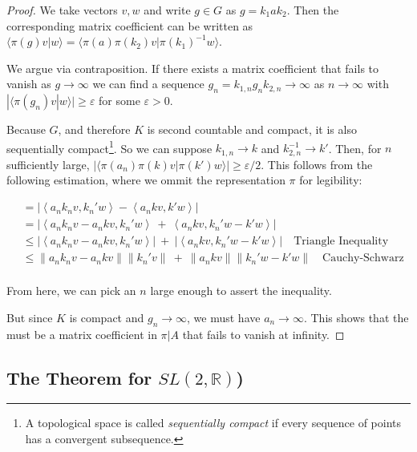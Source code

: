 \documentclass[
  12pt
]{article}
\theoremstyle{plain}
\newtheorem*{proof}{Proof}
\newcommand{\abs}[1]{| #1 |}
\newcommand{\inn}[1]{\left\langle #1 \right\rangle}
\newcommand{\norm}[1]{\lVert #1 \rVert}
\begin{document}
  \begin{proof}
    \label{pf:lemma}
    We take vectors $v, w$ and write $g \in G$ as $g = k_1 a k_2$.
    Then the corresponding matrix
    coefficient can be written as $\langle \pi(g)v|w \rangle = \langle \pi(a) \pi(k_2) v | \pi(k_1)^{-1} w \rangle$.

    We argue via contraposition.
    If there exists a matrix coefficient that fails to vanish as $g \rightarrow \infty$
    we can find a sequence $g_n = k_{1,n} g_{n} k_{2,n} \rightarrow \infty$ as
    $n \rightarrow \infty$ with
    $|\langle \pi(g_n) v | w \rangle | \geq \varepsilon$ for some $\varepsilon > 0$.

    Because $G$, and therefore $K$ is second countable and compact, it is also sequentially compact\footnote{A topological space is called \emph{sequentially compact} if every sequence of points has a convergent subsequence.}.
    So we can suppose $k_{1,n} \rightarrow k$ and $k_{2,n}^{-1} \rightarrow k'$.
    Then, for $n$ sufficiently large, $|\langle \pi(a_n)\pi(k)v | \pi(k') w \rangle | \geq \varepsilon/2$.
    This follows from the following estimation, where we ommit the representation $\pi$ for legibility:

    \begin{align*}
        &=\abs{\inn{a_n k_n v, k_n' w} - \inn{a_n k v, k' w}} \\
        &= \abs{\inn{a_nk_nv - a_nkv, k_n'w} \ + \ \inn{a_nkv, k_n'w - k'w}}  \\
        &\leq \abs{\inn{a_nk_nv - a_nkv, k_n'w}} \ + \ \abs{\inn{a_nkv, k_n'w - k'w}} \quad \text{Triangle Inequality} \\
        &\leq \norm{a_nk_nv - a_nkv}\norm{k_n'v} \ + \ \norm{a_nkv}\norm{k_n'w - k'w} \quad \text{Cauchy-Schwarz} \\
     \end{align*}

    From here, we can pick an $n$ large enough to assert the inequality.

    But since $K$ is compact and $g_n \rightarrow \infty$, we must have
    $a_n \rightarrow \infty$. This shows that the must be a matrix
    coefficient in $\pi | A$ that fails to vanish at infinity.
  \end{proof}

  \hypertarget{theorem-for-sl2-r}{%
  \subsection{The Theorem for \texorpdfstring{$SL(2, \mathbb{R})$}{SN(2, R)})}\label{theorem-for-sl2-r}}
\end{document}
